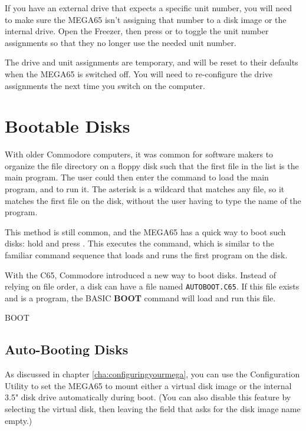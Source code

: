 If you have an external drive that expects a specific unit number, you will need to make sure the MEGA65 isn't assigning that number to a disk image or the internal drive. Open the Freezer, then press  or  to toggle the unit number assignments so that they no longer use the needed unit number.

The drive and unit assignments are temporary, and will be reset to their defaults when the MEGA65 is switched off. You will need to re-configure the drive assignments the next time you switch on the computer.


\section{Bootable Disks}

With older Commodore computers, it was common for software makers to organize the file directory on a floppy disk such that the first file in the list is the main program. The user could then enter the command  to load the main program, and  to run it. The asterisk is a wildcard that matches any file, so it matches the first file on the disk, without the user having to type the name of the program.

This method is still common, and the MEGA65 has a quick way to boot such disks: hold  and press . This executes the  command, which is similar to the familiar command sequence that loads and runs the first program on the disk.

With the C65, Commodore introduced a new way to boot disks. Instead of relying on file order, a disk can have a file named {\tt AUTOBOOT.C65}. If this file exists and is a program, the BASIC {\bf BOOT} command will load and run this file.

\begin{screenoutput}
BOOT
\end{screenoutput}

\subsection{Auto-Booting Disks}

As discussed in chapter \vref{cha:configuringyourmega}, you can use the Configuration Utility to set the MEGA65 to mount either a virtual disk image or the internal 3.5" disk drive automatically during boot. (You can also disable this feature by selecting the virtual disk, then leaving the field that asks for the disk image name empty.)

